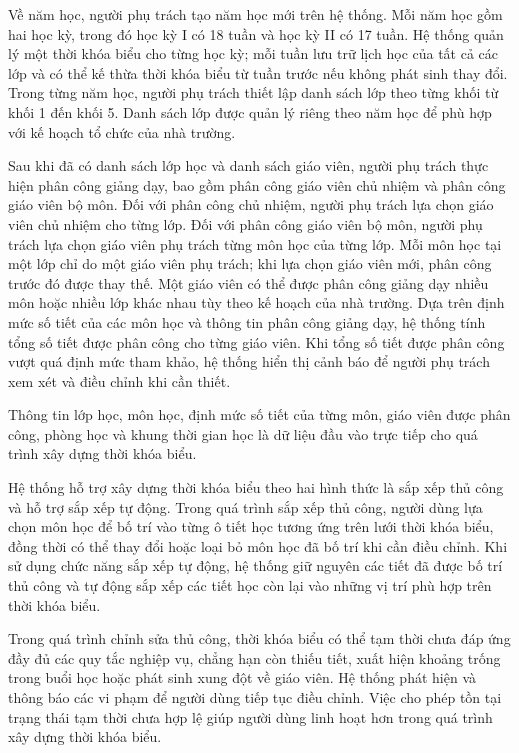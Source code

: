 \documentclass[../DoAn.tex]{subfiles}
\begin{document}
Về năm học, người phụ trách tạo năm học mới trên hệ thống. Mỗi năm học gồm hai học kỳ, trong đó học kỳ I có 18 tuần và học kỳ II có 17 tuần. Hệ thống quản lý một thời khóa biểu cho từng học kỳ; mỗi tuần lưu trữ lịch học của tất cả các lớp và có thể kế thừa thời khóa biểu từ tuần trước nếu không phát sinh thay đổi.
Trong từng năm học, người phụ trách thiết lập danh sách lớp theo từng khối từ khối 1 đến khối 5. Danh sách lớp được quản lý riêng theo năm học để phù hợp với kế hoạch tổ chức của nhà trường.

Sau khi đã có danh sách lớp học và danh sách giáo viên, người phụ trách thực hiện phân công giảng dạy, bao gồm phân công giáo viên chủ nhiệm và phân công giáo viên bộ môn. Đối với phân công chủ nhiệm, người phụ trách lựa chọn giáo viên chủ nhiệm cho từng lớp. Đối với phân công giáo viên bộ môn, người phụ trách lựa chọn giáo viên phụ trách từng môn học của từng lớp. Mỗi môn học tại một lớp chỉ do một giáo viên phụ trách; khi lựa chọn giáo viên mới, phân công trước đó được thay thế. Một giáo viên có thể được phân công giảng dạy nhiều môn hoặc nhiều lớp khác nhau tùy theo kế hoạch của nhà trường. 
Dựa trên định mức số tiết của các môn học và thông tin phân công giảng dạy, hệ thống tính tổng số tiết được phân công cho từng giáo viên. Khi tổng số tiết được phân công vượt quá định mức tham khảo, hệ thống hiển thị cảnh báo để người phụ trách xem xét và điều chỉnh khi cần thiết.

Thông tin lớp học, môn học, định mức số tiết của từng môn, giáo viên được phân công, phòng học và khung thời gian học là dữ liệu đầu vào trực tiếp cho quá trình xây dựng thời khóa biểu.

Hệ thống hỗ trợ xây dựng thời khóa biểu theo hai hình thức là sắp xếp thủ công và hỗ trợ sắp xếp tự động. Trong quá trình sắp xếp thủ công, người dùng lựa chọn môn học để bố trí vào từng ô tiết học tương ứng trên lưới thời khóa biểu, đồng thời có thể thay đổi hoặc loại bỏ môn học đã bố trí khi cần điều chỉnh. Khi sử dụng chức năng sắp xếp tự động, hệ thống giữ nguyên các tiết đã được bố trí thủ công và tự động sắp xếp các tiết học còn lại vào những vị trí phù hợp trên thời khóa biểu.

Trong quá trình chỉnh sửa thủ công, thời khóa biểu có thể tạm thời chưa đáp ứng đầy đủ các quy tắc nghiệp vụ, chẳng hạn còn thiếu tiết, xuất hiện khoảng trống trong buổi học hoặc phát sinh xung đột về giáo viên. Hệ thống phát hiện và thông báo các vi phạm để người dùng tiếp tục điều chỉnh. Việc cho phép tồn tại trạng thái tạm thời chưa hợp lệ giúp người dùng linh hoạt hơn trong quá trình xây dựng thời khóa biểu.
\end{document}
